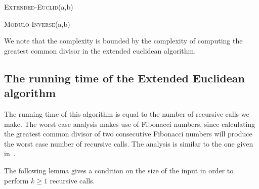 \documentclass[a4paper,oneside,article,11pt]{memoir}
\begin{document}
\begin{algorithm}[H]
\caption{\textsc{Extended-Euclid}(a,b)}
\label{alg:extended_euclidean}
\begin{algorithmic}[1]
\ELSE
\ENDIF
\end{algorithmic}
\end{algorithm}

\begin{algorithm}[H]
\caption{\textsc{Modulo Inverse}(a,b)}
\label{alg:modinv}
\begin{algorithmic}[1]
\ELSE
\ENDIF
\end{algorithmic}
\end{algorithm}

We note that the complexity is bounded by the complexity of computing the greatest common divisor in the extended euclidean algorithm.

\subsection{The running time of the Extended Euclidean algorithm}
The running time of this algorithm is equal to the number of recursive calls we make. The worst case analysis makes use of Fibonacci numbers, since calculating the greatest common divisor of two consecutive Fibonacci numbers will produce the worst case number of recursive calls.
The analysis is similar to the one given in~\cite[p.~935-937]{clrs}.

The following lemma gives a condition on the size of the input in order to perform $k \geq 1$ recursive calls.
\end{document}
